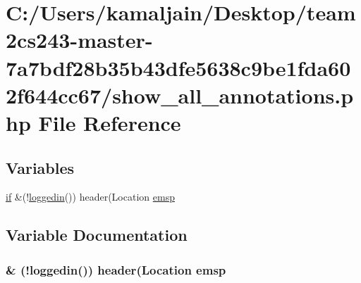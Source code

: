 \hypertarget{show__all__annotations_8php}{}\section{C\+:/\+Users/kamaljain/\+Desktop/team2cs243-\/master-\/7a7bdf28b35b43dfe5638c9be1fda602f644cc67/show\+\_\+all\+\_\+annotations.php File Reference}
\label{show__all__annotations_8php}
\subsection*{Variables}
\begin{DoxyCompactItemize}
\item 
\hyperlink{login_8php_a6cf3ef86567b2d2e235730bbe61cb311}{if} \&(!\hyperlink{core_8php_aab6c166eb2634a4ddbacc2f19417fe5c}{loggedin}()) header(\textquotesingle{}Location \hyperlink{show__all__annotations_8php_afa30d5bb1e7774ef5f682c4949a11548}{emsp}
\end{DoxyCompactItemize}


\subsection{Variable Documentation}
\subsubsection[{\texorpdfstring{emsp}{emsp}}]{\& (!{\bf loggedin}()) header(\textquotesingle{}Location emsp}\hypertarget{show__all__annotations_8php_afa30d5bb1e7774ef5f682c4949a11548}{}\label{show__all__annotations_8php_afa30d5bb1e7774ef5f682c4949a11548}
